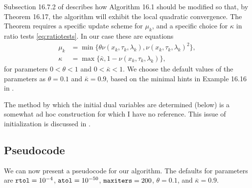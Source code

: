 \documentclass[11pt]{article}
\begin{document}
Subsection 16.7.2 of \cite{GrivaNashSofer2009} describes how Algorithm 16.1 should be modified so that, by Theorem 16.17, the algorithm will exhibit the local quadratic convergence.  The Theorem requires a specific update scheme for $\mu_k$, and a specific choice for $\kappa$ in ratio tests \eqref{eq:ratiotests}.  In our case these are equations
\begin{align}
\mu_k &= \min\{\theta \nu(x_k,\tau_k,\lambda_k),\nu(x_k,\tau_k,\lambda_k)^2\}, \label{eq:muupdate} \\
\kappa &= \max\{\bar\kappa,1-\nu(x_k,\tau_k,\lambda_k)\}, \label{eq:kappaformula}
\end{align}
for parameters $0<\theta<1$ and $0<\bar\kappa<1$.  We choose the default values of the parameters as $\theta=0.1$ and $\bar\kappa=0.9$, based on the minimal hints in Example 16.16 in \cite{GrivaNashSofer2009}.

The method by which the initial dual variables are determined (below) is a somewhat ad hoc construction for which I have no reference.  This issue of initialization is discussed in \cite{Gertzetal2004}.


\subsection*{Pseudocode}

We can now present a pseudocode for our algorithm.  The defaults for parameters are $\text{\texttt{rtol}}=10^{-4}$, $\text{\texttt{atol}}=10^{-50}$, $\text{\texttt{maxiters}}=200$, $\theta=0.1$, and $\bar\kappa=0.9$.
\end{document}
